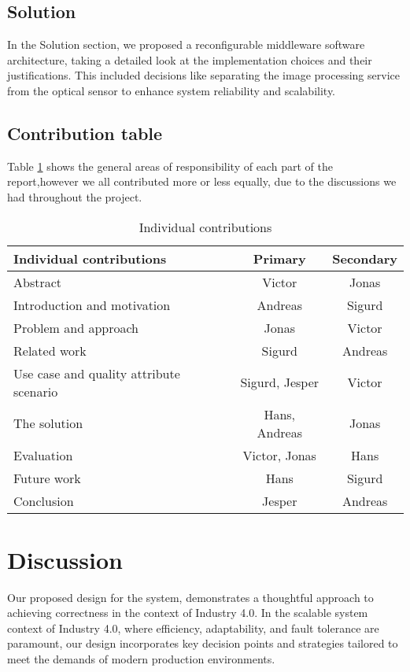 \documentclass[conference]{IEEEtran}
\begin{document}
\subsection{Solution}
In the Solution section, we proposed a reconfigurable middleware software architecture, taking a detailed look at the implementation choices and their justifications. This included decisions like separating the image processing service from the optical sensor to enhance system reliability and scalability.

\subsection{Contribution table}
Table \ref{tab:contributions} shows the general areas of responsibility of each part of the report,however we all contributed more or less equally, due to the discussions we had throughout the project. 

\begin{table}[ht]
    \centering
    \begin{tabular}{|l|c|c|} \hline 
         \textbf{Individual contributions} &  \textbf{Primary} & \textbf{Secondary}\\ \hline 
         Abstract&  Victor & Jonas\\ \hline 
         Introduction and motivation&  Andreas & Sigurd\\ \hline 
         Problem and approach&  Jonas & Victor\\ \hline 
         Related work&  Sigurd & Andreas\\ \hline 
         Use case and quality attribute scenario& Sigurd, Jesper & Victor\\ \hline 
         The solution&  Hans, Andreas & Jonas\\ \hline 
         Evaluation&  Victor, Jonas & Hans\\ \hline 
         Future work&  Hans& Sigurd\\ \hline 
         Conclusion&  Jesper & Andreas\\ \hline
    \end{tabular}
    \caption{Individual contributions}
    \label{tab:contributions}
\end{table}

\section{Discussion}

Our proposed design for the system, demonstrates a thoughtful approach to achieving correctness in the context of Industry 4.0. In the scalable system context of Industry 4.0, where efficiency, adaptability, and fault tolerance are paramount, our design incorporates key decision points and strategies tailored to meet the demands of modern production environments.
\end{document}
